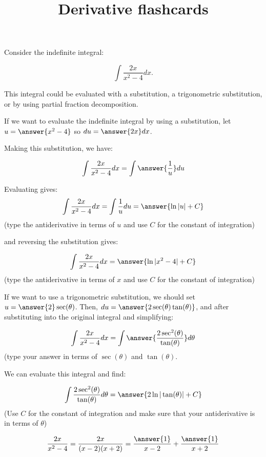 \documentclass{ximera}
\title{Derivative flashcards}
\begin{document}
\begin{exercise}
Consider the indefinite integral:
 
\[
\int \frac{2x}{x^2-4} dx.
\]
 
This integral could be evaluated with a substitution, a trigonometric substitution, or by using partial fraction decomposition.
 
If we want to evaluate the indefinite integral by using a substitution, let $u= \answer{x^2-4}$ so $du = \answer{2x} dx$.
 
\begin{exercise}
Making this substitution, we have:
 
\[
\int \frac{2x}{x^2-4} dx = \int \answer{\frac{1}{u}} du
\]
\begin{exercise}
Evaluating gives:
\[
\int \frac{2x}{x^2-4} dx = \int\frac{1}{u} du = \answer{\ln|u|+C}
\]
(type the antiderivative in terms of $u$ and use $C$ for the constant of integration)
 
and reversing the substitution gives:
 
\[
\int \frac{2x}{x^2-4} dx = \answer{\ln|x^2-4|+C}
\]
(type the antiderivative in terms of $x$ and use $C$ for the constant of integration)
\end{exercise}
\end{exercise}

\begin{exercise}
If we want to use a trigonometric substitution, we should set $u=\answer{2} \sec(\theta)$.  Then, $du = \answer{2 \sec(\theta)\tan(\theta)}$, and after substituting into the original integral and simplifying:
 
\[
\int \frac{2x}{x^2-4} dx = \int \answer{\frac{2 \sec^2(\theta)}{\tan(\theta)}} d\theta
\]
(type your answer in terms of $\sec(\theta)$ and $\tan(\theta)$.
 
\begin{exercise}
We can evaluate this integral and find:
 
\[
 \int \frac{2 \sec^2(\theta)}{\tan(\theta)} d\theta = \answer{2 \ln|\tan(\theta)|+C}
\]
(Use $C$ for the constant of integration and make sure that your antiderivative is in terms of $\theta$)
 
\end{exercise}
\end{exercise}
 
\[
\frac{2x}{x^2-4} = \frac{2x}{(x-2)(x+2)} = \frac{\answer{1}}{x-2}+\frac{\answer{1}}{x+2}
\]
  
\end{exercise}
\end{document}
